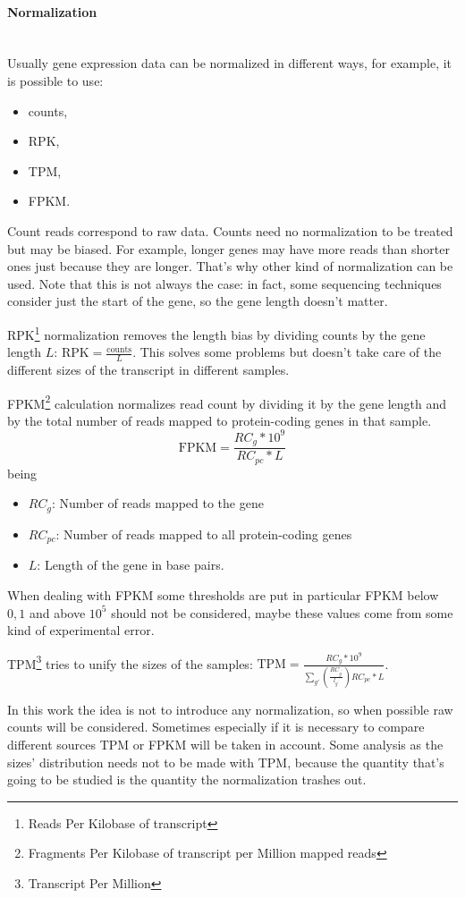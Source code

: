 \paragraph{Normalization}\mbox{}\\
Usually gene expression data can be normalized in different ways, for example, it is possible to use:
\begin{itemize}
	\item counts,
	\item RPK,
	\item TPM,
	\item FPKM.
\end{itemize}
Count reads correspond to raw data. Counts need no normalization to be treated but may be biased. For example, longer genes may have more reads than shorter ones just because they are longer. That's why other kind of normalization can be used. Note that this is not always the case: in fact, some sequencing techniques consider just the start of the gene, so the gene length doesn't matter.   

RPK\footnote{Reads Per Kilobase of transcript} normalization removes the length bias by dividing counts by the gene length $L$: \(\text{RPK}=\frac{\text{counts}}{L}\). This solves some problems but doesn't take care of the different sizes of the transcript in different samples.

FPKM\footnote{Fragments Per Kilobase of transcript per Million mapped reads} calculation normalizes read count by dividing it by the gene length and by the total number of reads mapped to protein-coding genes in that sample.
\[
\text{FPKM} = \frac{RC_g*10^9}{RC_{pc}*L}
\]
being
\begin{itemize}
	\item $RC_g$: Number of reads mapped to the gene
	\item $RC_{pc}$: Number of reads mapped to all protein-coding genes
	\item $L$: Length of the gene in base pairs.
\end{itemize}
When dealing with FPKM some thresholds are put in particular FPKM below $0,1$ and above $10^5$ should not be considered, maybe these values come from some kind of experimental error.

TPM\footnote{Transcript Per Million} tries to unify the sizes of the samples: $\text{TPM} = \frac{RC_g*10^9}{\sum_{g\prime} \left(\frac{RC_{g^\prime}}{l_{g^\prime}}\right) RC_{pc}*L}$.

In this work the idea is not to introduce any normalization, so when possible raw counts will be considered. Sometimes especially if it is necessary to compare different sources TPM or FPKM will be taken in account. Some analysis as the sizes' distribution needs not to be made with TPM, because the quantity that's going to be studied is the quantity the normalization trashes out.

